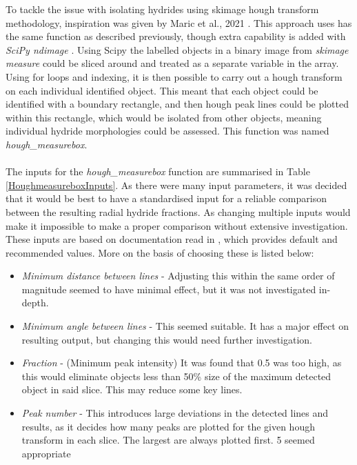 \documentclass{article}
\begin{document}
    \noindent To tackle the issue with isolating hydrides using skimage hough transform methodology, inspiration was given by Maric et al., 2021 \cite{Maric2021}. This approach uses has the same function as  described previously, though extra capability is added with \textit{SciPy ndimage} \cite{Scipy2021}. Using Scipy the labelled objects in a binary image from \textit{skimage measure} could be sliced around and treated as a separate variable in the array. Using for loops and indexing, it is then possible to carry out a hough transform on each individual identified object. This meant that each object could be identified with a boundary rectangle, and then hough peak lines could be plotted within this rectangle, which would be isolated from other objects, meaning individual hydride morphologies could be assessed. This function was named \textit{hough\_measurebox}.
    \\
    \\
    The inputs for the \textit{hough\_measurebox} function are summarised in Table \ref{HoughmeasureboxInputs}. As there were many input parameters, it was decided that it would be best to have a standardised input for a reliable comparison between the resulting radial hydride fractions. As changing multiple inputs would make it impossible to make a proper comparison without extensive investigation. These inputs are based on documentation read in \cite{ScikitimageB}, which provides default and recommended values. More on the basis of choosing these is listed below:

    \begin{itemize}
        \item \textit{Minimum distance between lines} - Adjusting this within the same order of magnitude seemed to have minimal effect, but it was not investigated in-depth.

        \item \textit{Minimum angle between lines} - This seemed suitable. It has a major effect on resulting output, but changing this would need further investigation.

        \item \textit{Fraction} - (Minimum peak intensity) It was found that 0.5 was too high, as this would eliminate objects less than 50\% size of the maximum detected object in said slice. This may reduce some key lines.

        \item \textit{Peak number} - This introduces large deviations in the detected lines and results, as it decides how many peaks are plotted for the given hough transform in each slice. The largest are always plotted first. 5 seemed appropriate
    \end{itemize}
\end{document}
